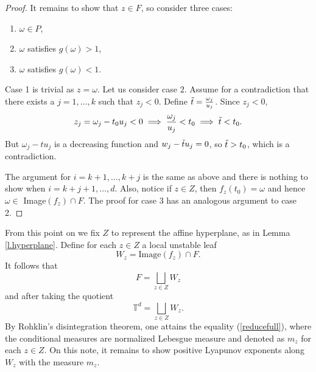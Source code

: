 \documentclass{amsart}
\newcommand{\TT}{\mathbb{T}}
\begin{document}
\begin{proof}
    It remains to show that $z\in F$, so consider three cases:
    \begin{enumerate}
        \item $\omega\in P$,
        \item $\omega$ satisfies $g(\omega)>1$,
        \item $\omega$ satisfies $g(\omega)<1$.
    \end{enumerate}
    Case 1 is trivial as $z = \omega$. Let us consider case $2$. Assume for a contradiction that there exists a $j = 1,\dots, k$ such that $z_j < 0$. Define $\Tilde{t} = \frac{\omega_j}{u_j}$. Since $z_j < 0$,
    \[z_j = \omega_j - t_0 u_j < 0 \implies \frac{\omega_j}{u_j} < t_0 \implies \Tilde{t} < t_0.\] 
    But $\omega_j - tu_j$ is a decreasing function and $w_j -\Tilde{t}u_j = 0$, so $\Tilde{t}> t_0$, which is a contradiction.
    
    The argument for $i = k+1, \dots, k+j$ is the same as above and there is nothing to show when $i = k+j+1, \dots, d$. Also, notice if $z\in Z$, then $f_z(t_0) = \omega$ and hence $\omega\in$ Image$(f_z)\cap F$. The proof for case 3 has an analogous argument to case 2.
\end{proof}

From this point on we fix $Z$ to represent the affine hyperplane, as in Lemma \ref{l.hyperplane}. Define for each $z\in Z$ a local unstable leaf
\[W_z = \text{Image}(f_z) \cap F.\] 
It follows that
\[F = \bigsqcup_{z\in Z} W_z\]
and after taking the quotient
\[\TT^d = \bigsqcup_{z\in Z} W_z.\]
By Rohklin's disintegration theorem, one attains the equality (\ref{reducefull}), where the conditional measures are normalized Lebesgue measure and denoted as $m_z$ for each $z\in Z$. On this note, it remains to show positive Lyapunov exponents along $W_z$ with the measure $m_z$.
\end{document}
